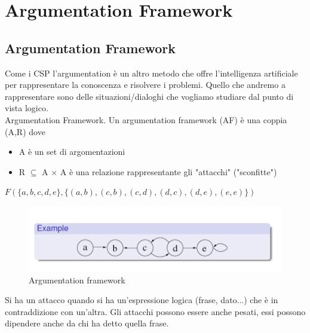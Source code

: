 \chapter{Argumentation Framework} \label{ch:Argumentation Framework}
\section{Argumentation Framework}
Come i CSP l’argumentation è un altro metodo che offre l’intelligenza artificiale per rappresentare la conoscenza e risolvere i problemi. Quello che andremo a rappresentare sono delle situazioni/dialoghi che vogliamo studiare dal punto di vista logico.
\\Argumentation Framework. Un argumentation framework (AF) è una coppia (A,R) dove
\begin{itemize}
    \item A è un set di argomentazioni
    \item R $\subseteq$ A × A è una relazione rappresentante gli "attacchi" ("sconfitte")
\end{itemize}
\begin{center}
    $F(\{a,b,c,d,e\}, \{(a,b),(c,b),(c,d),(d,c),(d,e),(e,e)\})$
\end{center}
\begin{figure}[htp]
	\centering
    \includegraphics[width=12cm, keepaspectratio]{img/Cap6/arg1.png}
    \caption{Argumentation framework}
\end{figure}
Si ha un attacco quando si ha un’espressione logica (frase, dato...) che è in contraddizione con un’altra. Gli attacchi possono essere anche pesati, essi possono dipendere anche da chi ha detto quella frase.

